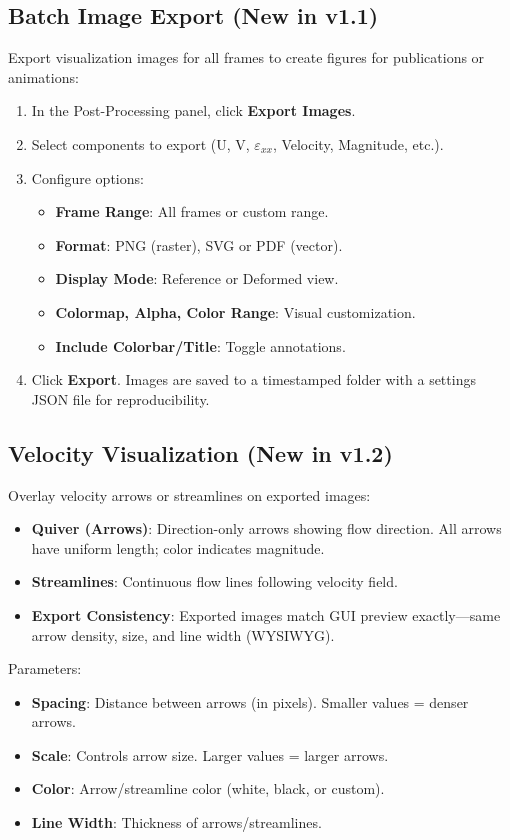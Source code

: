 \documentclass[a4paper,12pt]{article}
\begin{document}
\subsection{Batch Image Export (New in v1.1)}
Export visualization images for all frames to create figures for publications or animations:
\begin{enumerate}
    \item In the Post-Processing panel, click \textbf{Export Images}.
    \item Select components to export (U, V, $\varepsilon_{xx}$, Velocity, Magnitude, etc.).
    \item Configure options:
    \begin{itemize}
        \item \textbf{Frame Range}: All frames or custom range.
        \item \textbf{Format}: PNG (raster), SVG or PDF (vector).
        \item \textbf{Display Mode}: Reference or Deformed view.
        \item \textbf{Colormap, Alpha, Color Range}: Visual customization.
        \item \textbf{Include Colorbar/Title}: Toggle annotations.
    \end{itemize}
    \item Click \textbf{Export}. Images are saved to a timestamped folder with a settings JSON file for reproducibility.
\end{enumerate}

\subsection{Velocity Visualization (New in v1.2)}
Overlay velocity arrows or streamlines on exported images:
\begin{itemize}
    \item \textbf{Quiver (Arrows)}: Direction-only arrows showing flow direction. All arrows have uniform length; color indicates magnitude.
    \item \textbf{Streamlines}: Continuous flow lines following velocity field.
    \item \textbf{Export Consistency}: Exported images match GUI preview exactly---same arrow density, size, and line width (WYSIWYG).
\end{itemize}

Parameters:
\begin{itemize}
    \item \textbf{Spacing}: Distance between arrows (in pixels). Smaller values = denser arrows.
    \item \textbf{Scale}: Controls arrow size. Larger values = larger arrows.
    \item \textbf{Color}: Arrow/streamline color (white, black, or custom).
    \item \textbf{Line Width}: Thickness of arrows/streamlines.
\end{itemize}
\end{document}
